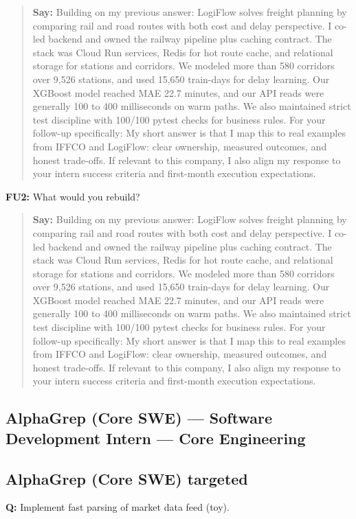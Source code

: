\documentclass[9pt,a4paper]{article}
\begin{document}
\begin{quote}\small\textbf{Say:} Building on my previous answer: LogiFlow solves freight planning by comparing rail and road routes with both cost and delay perspective. I co-led backend and owned the railway pipeline plus caching contract. The stack was Cloud Run services, Redis for hot route cache, and relational storage for stations and corridors. We modeled more than 580 corridors over 9,526 stations, and used 15,650 train-days for delay learning. Our XGBoost model reached MAE 22.7 minutes, and our API reads were generally 100 to 400 milliseconds on warm paths. We also maintained strict test discipline with 100/100 pytest checks for business rules. For your follow-up specifically: My short answer is that I map this to real examples from IFFCO and LogiFlow: clear ownership, measured outcomes, and honest trade-offs. If relevant to this company, I also align my response to your intern success criteria and first-month execution expectations.\end{quote}
\vspace{2mm}
\textbf{FU2:} What would you rebuild?

\begin{quote}\small\textbf{Say:} Building on my previous answer: LogiFlow solves freight planning by comparing rail and road routes with both cost and delay perspective. I co-led backend and owned the railway pipeline plus caching contract. The stack was Cloud Run services, Redis for hot route cache, and relational storage for stations and corridors. We modeled more than 580 corridors over 9,526 stations, and used 15,650 train-days for delay learning. Our XGBoost model reached MAE 22.7 minutes, and our API reads were generally 100 to 400 milliseconds on warm paths. We also maintained strict test discipline with 100/100 pytest checks for business rules. For your follow-up specifically: My short answer is that I map this to real examples from IFFCO and LogiFlow: clear ownership, measured outcomes, and honest trade-offs. If relevant to this company, I also align my response to your intern success criteria and first-month execution expectations.\end{quote}
\vspace{2mm}
\newpage
\subsection{AlphaGrep (Core SWE) --- Software Development Intern --- Core Engineering}
\subsection{AlphaGrep (Core SWE) targeted}
\textbf{Q:} Implement fast parsing of market data feed (toy).
\end{document}

